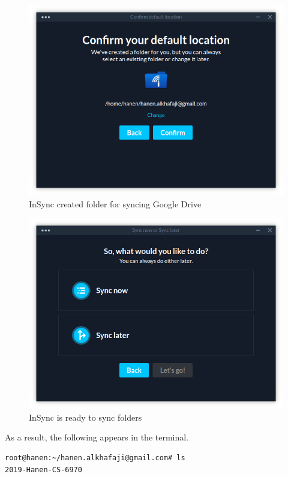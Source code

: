 \begin{figure}[htb]
  \centering
  \includegraphics[scale=0.4]{images/insync4.png}
  \caption{InSync created folder for syncing Google Drive}
  \label{fig:insync4}
\end{figure}
\begin{figure}[htb]
  \centering
  \includegraphics[scale=0.4]{images/insync5.png}
  \caption{InSync is ready to sync folders}
  \label{fig:insync5}
\end{figure}
As a result, the following appears in the terminal.
\begin{verbatim}
root@hanen:~/hanen.alkhafaji@gmail.com# ls
2019-Hanen-CS-6970
\end{verbatim}

